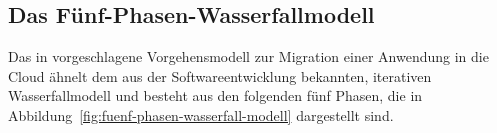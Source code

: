\subsection{Das Fünf-Phasen-Wasserfallmodell}
\label{cha:five_phases}
Das in  vorgeschlagene Vorgehensmodell zur Migration
einer Anwendung in die Cloud ähnelt dem aus der
Softwareentwicklung bekannten, iterativen Wasserfallmodell und besteht aus den
folgenden fünf Phasen, die in Abbildung~\ref{fig:fuenf-phasen-wasserfall-modell}
dargestellt sind.

